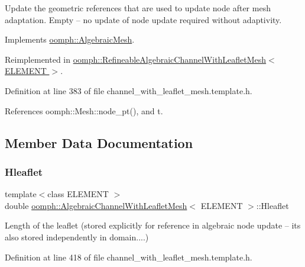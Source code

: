 Update the geometric references that are used to update node after mesh adaptation. Empty -- no update of node update required without adaptivity. 



Implements \hyperlink{classoomph_1_1AlgebraicMesh_a6c6a35ae2be6e2766f5b80d85693c1ce}{oomph\+::\+Algebraic\+Mesh}.



Reimplemented in \hyperlink{classoomph_1_1RefineableAlgebraicChannelWithLeafletMesh_a8ee7168fbb84bb87880a2590dd52eaa8}{oomph\+::\+Refineable\+Algebraic\+Channel\+With\+Leaflet\+Mesh$<$ E\+L\+E\+M\+E\+N\+T $>$}.



Definition at line 383 of file channel\+\_\+with\+\_\+leaflet\+\_\+mesh.\+template.\+h.



References oomph\+::\+Mesh\+::node\+\_\+pt(), and t.



\subsection{Member Data Documentation}
\mbox{\label{classoomph_1_1AlgebraicChannelWithLeafletMesh_a22e6274b52941ae60cbe66287dd02fb4}} 
\subsubsection{\texorpdfstring{Hleaflet}{Hleaflet}}
{\footnotesize\ttfamily template$<$class E\+L\+E\+M\+E\+NT $>$ \\
double \hyperlink{classoomph_1_1AlgebraicChannelWithLeafletMesh}{oomph\+::\+Algebraic\+Channel\+With\+Leaflet\+Mesh}$<$ E\+L\+E\+M\+E\+NT $>$\+::Hleaflet\hspace{0.3cm}{\ttfamily [protected]}}

Length of the leaflet (stored explicitly for reference in algebraic node update -- it\textquotesingle{}s also stored independently in domain....) 

Definition at line 418 of file channel\+\_\+with\+\_\+leaflet\+\_\+mesh.\+template.\+h.

\mbox{\label{classoomph_1_1AlgebraicChannelWithLeafletMesh_a1577beb584df4ad0f8517563934855fc}} 
